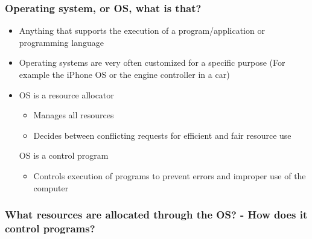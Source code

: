 
\subsubsection*{Operating system, or OS, what is that?}
\begin{itemize}
\item Anything that supports the execution of a program/application or programming language

\item Operating systems are very often customized for a specific purpose (For example the iPhone OS or the engine controller in a car)

\item
  OS is a resource allocator
  \begin{itemize}
  \item Manages all resources
  \item Decides between conflicting requests for efficient and fair resource use
  \end{itemize}

  OS is a control program
  \begin{itemize}
    \item Controls execution of programs to prevent errors and improper use of the computer
  \end{itemize}
\end{itemize}

\subsubsection*{What resources are allocated through the OS? - How does it control programs?}
